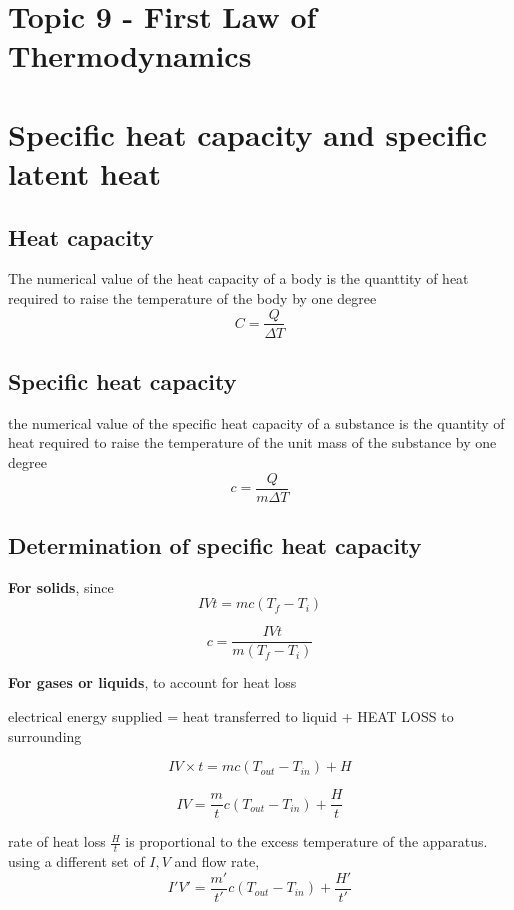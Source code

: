 \documentclass[a4paper, 10pt]{article}
\begin{document}
\section*{Topic 9 - First Law of Thermodynamics}

\section{Specific heat capacity and specific latent heat}
\subsection{Heat capacity}
\begin{frame}
The numerical value of the heat capacity of a body is the quanttity of heat required to raise the temperature of the body by one degree
\[
C = \frac{Q}{\Delta T}
\]
\end{frame}	
\subsection{Specific heat capacity}
\begin{framed}
   the numerical value of the specific heat capacity of a substance is the quantity of heat required to raise the temperature of the unit mass of the substance by one degree
   \[
   c = \frac{Q}{m\Delta T}
   \]
\end{framed}	

\subsection{Determination of specific heat capacity}
\textbf{For solids}, since
\[
  IVt = mc(T_f - T_i)
\]

\[
   c = \frac{IVt}{m(T_f - T_i)}
\]

\textbf{For gases or liquids}, to account for heat loss
\begin{center}
   electrical energy supplied = heat transferred to liquid + HEAT LOSS to surrounding
\end{center}	

\[
   IV \times t = mc(T_{out} - T_{in}) + H
\]

\[
   IV = \frac{m}{t}c (T_{out} - T_{in}) + \frac{H}{t}
\]

rate of heat loss $\frac{H}{t}$ is proportional to the excess temperature of the apparatus. \\

using a different set of $I, V$ and flow rate, 
\[
   I'V' = \frac{m'}{t'}c (T_{out} - T_{in}) + \frac{H'}{t'}
\]
\end{document}
